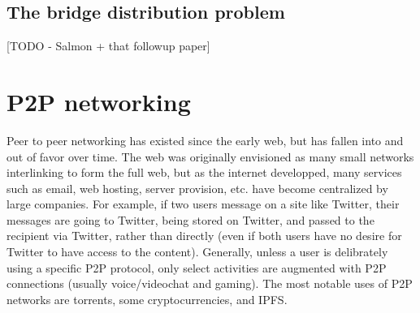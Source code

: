 \documentclass[12pt]{report}
\begin{document}
\subsection{The bridge distribution problem}
\label{distribution}

[TODO - Salmon + that followup paper]

\section{P2P networking}

Peer to peer networking has existed since the early web, but has fallen into and out of favor over time. The web was originally envisioned as many small networks interlinking to form the full web, but as the internet developped, many services such as email, web hosting, server provision, etc. have become centralized by large companies. For example, if two users message on a site like Twitter, their messages are going to Twitter, being stored on Twitter, and passed to the recipient via Twitter, rather than directly (even if both users have no desire for Twitter to have access to the content). Generally, unless a user is delibrately using a specific P2P protocol, only select activities are augmented with P2P connections (usually voice/videochat and gaming). The most notable uses of P2P networks are torrents, some cryptocurrencies, and IPFS.
\end{document}
